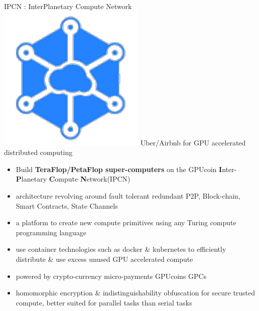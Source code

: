 \begin{frame}[t]{IPCN
	: InterPlanetary Compute Network}
	\includegraphics[scale=.15]{static/ipcn-p2p}
	 Uber/Airbnb for GPU accelerated distributed computing
 \begin{itemize}[<+-| alert@+>]
 \item Build \textbf{TeraFlop/PetaFlop super-computers} on  the GPUcoin \textbf{I}nter-\textbf{P}lanetary \textbf{C}ompute \textbf{N}etwork(IPCN)
 \item architecture revolving around fault tolerant redundant P2P, Block-chain, Smart Contracts, State Channels
 \item a platform to create new compute primitives using any Turing compute programming language
 \item use container technologies such as docker \& kubernetes to efficiently distribute \& use excess unused GPU accelerated compute
 \item powered by crypto-currency micro-payments GPUcoins GPCs
 \item  homomorphic encryption \& indistinguishability obfuscation for secure trusted compute, better suited for parallel tasks than serial tasks
 \end{itemize}
\end{frame}